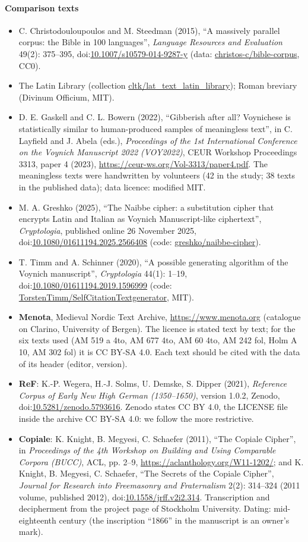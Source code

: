 \paragraph{Comparison texts}
\begin{itemize}
\item C. Christodouloupoulos and M. Steedman (2015), ``A massively parallel corpus: the Bible in 100 languages'',
  \emph{Language Resources and Evaluation} 49(2): 375--395, doi:\url{10.1007/s10579-014-9287-y} (data: \url{christos-c/bible-corpus},
  CC0).
\item The Latin Library (collection \url{cltk/lat_text_latin_library}); Roman breviary (Divinum Officium, MIT).
\item D. E. Gaskell and C. L. Bowern (2022), ``Gibberish after all? Voynichese is statistically similar to human-produced
  samples of meaningless text'', in C. Layfield and J. Abela (eds.), \emph{Proceedings of the 1st International Conference
  on the Voynich Manuscript 2022 (VOY2022)}, CEUR Workshop Proceedings 3313, paper 4 (2023),
  \url{https://ceur-ws.org/Vol-3313/paper4.pdf}. The meaningless texts were handwritten by volunteers (42 in the study; 38
  texts in the published data); data licence: modified MIT.
\item M. A. Greshko (2025), ``The Naibbe cipher: a substitution cipher that encrypts Latin and Italian as Voynich
  Manuscript-like ciphertext'', \emph{Cryptologia}, published online 26 November 2025, doi:\url{10.1080/01611194.2025.2566408}
  (code: \url{greshko/naibbe-cipher}).
\item T. Timm and A. Schinner (2020), ``A possible generating algorithm of the Voynich manuscript'', \emph{Cryptologia}
  44(1): 1--19, doi:\url{10.1080/01611194.2019.1596999} (code: \url{TorstenTimm/SelfCitationTextgenerator}, MIT).
\item \textbf{Menota}, Medieval Nordic Text Archive, \url{https://www.menota.org} (catalogue on Clarino, University of
  Bergen). The licence is stated text by text; for the six texts used (AM 519 a 4to, AM 677 4to, AM 60 4to, AM 242 fol,
  Holm A 10, AM 302 fol) it is CC BY-SA 4.0. Each text should be cited with the data of its header (editor, version).
\item \textbf{ReF}: K.-P. Wegera, H.-J. Solms, U. Demske, S. Dipper (2021), \emph{Reference Corpus of Early New High
  German (1350--1650)}, version 1.0.2, Zenodo, doi:\url{10.5281/zenodo.5793616}. Zenodo states CC BY 4.0, the LICENSE file inside
  the archive CC BY-SA 4.0: we follow the more restrictive.
\item \textbf{Copiale}: K. Knight, B. Megyesi, C. Schaefer (2011), ``The Copiale Cipher'', in \emph{Proceedings of the 4th
  Workshop on Building and Using Comparable Corpora (BUCC)}, ACL, pp. 2--9, \url{https://aclanthology.org/W11-1202/}; and K.
  Knight, B. Megyesi, C. Schaefer, ``The Secrets of the Copiale Cipher'', \emph{Journal for Research into Freemasonry and
  Fraternalism} 2(2): 314--324 (2011 volume, published 2012), doi:\url{10.1558/jrff.v2i2.314}. Transcription and decipherment
  from the project page of Stockholm University. Dating: mid-eighteenth century (the inscription ``1866'' in the manuscript
  is an owner's mark).
\end{itemize}

